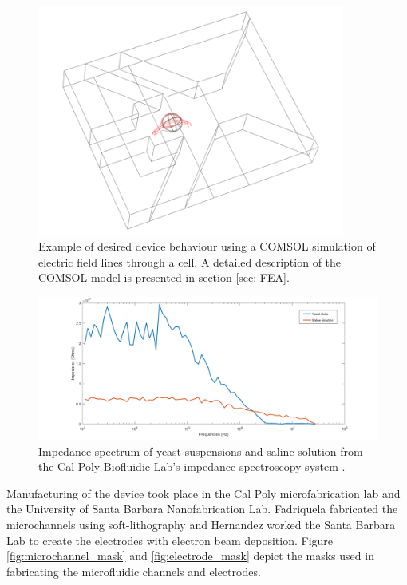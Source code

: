 \begin{figure}[h]
    \centering
    \includegraphics[width=0.9\textwidth]{images/josh_steph_sim.png}
    \caption[Example of desired device behaviour using a COMSOL simulation of electric field lines through a cell.]{Example of desired device behaviour using a COMSOL simulation of electric field lines through a cell. A detailed description of the COMSOL model is presented in section \ref{sec: FEA}.}
    \label{fig:josh-steph_sim}
\end{figure}


\begin{figure}[h]
    \centering
    \includegraphics[width=\textwidth]{images/stephanie_impedance_data.png}
    \caption[Impedance spectrum of yeast suspensions and saline solution from the Cal Poly Biofluidic Lab's impedance spectroscopy system]{Impedance spectrum of yeast suspensions and saline solution from the Cal Poly Biofluidic Lab's impedance spectroscopy system \cite{hernandez_single_2009-1}.}
    \label{fig:stephanie_impedance_data}
\end{figure}

\par Manufacturing of the device took place in the Cal Poly microfabrication lab and the University of Santa Barbara Nanofabrication Lab. Fadriquela fabricated the microchannels using soft-lithography and Hernandez worked the Santa Barbara Lab to create the electrodes with electron beam deposition. Figure \ref{fig:microchannel_mask} and \ref{fig:electrode_mask} depict the masks used in fabricating the microfluidic channels and electrodes.

